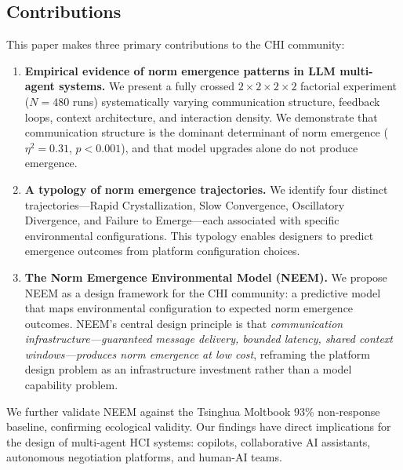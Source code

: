 \subsection{Contributions}

This paper makes three primary contributions to the CHI community:

\begin{enumerate}
\item \textbf{Empirical evidence of norm emergence patterns in LLM multi-agent systems.} We present a fully crossed $2\times2\times2\times2$ factorial experiment ($N=480$ runs) systematically varying communication structure, feedback loops, context architecture, and interaction density. We demonstrate that communication structure is the dominant determinant of norm emergence ($\eta^2=0.31$, $p<0.001$), and that model upgrades alone do not produce emergence.

\item \textbf{A typology of norm emergence trajectories.} We identify four distinct trajectories—Rapid Crystallization, Slow Convergence, Oscillatory Divergence, and Failure to Emerge—each associated with specific environmental configurations. This typology enables designers to predict emergence outcomes from platform configuration choices.

\item \textbf{The Norm Emergence Environmental Model (NEEM).} We propose NEEM as a design framework for the CHI community: a predictive model that maps environmental configuration to expected norm emergence outcomes. NEEM's central design principle is that \emph{communication infrastructure—guaranteed message delivery, bounded latency, shared context windows—produces norm emergence at low cost}, reframing the platform design problem as an infrastructure investment rather than a model capability problem.
\end{enumerate}

We further validate NEEM against the Tsinghua Moltbook 93\% non-response baseline, confirming ecological validity. Our findings have direct implications for the design of multi-agent HCI systems: copilots, collaborative AI assistants, autonomous negotiation platforms, and human-AI teams.